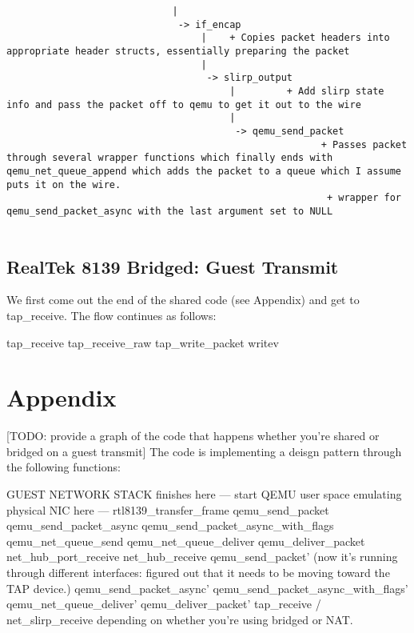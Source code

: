 \documentclass[11pt,pdftex,twocolumn]{article}
\begin{document}
\begin{verbatim}
                             |
                              -> if_encap
                                  |    + Copies packet headers into appropriate header structs, essentially preparing the packet
                                  |
                                   -> slirp_output
                                       |         + Add slirp state info and pass the packet off to qemu to get it out to the wire
                                       |
                                        -> qemu_send_packet
                                                       + Passes packet through several wrapper functions which finally ends with qemu_net_queue_append which adds the packet to a queue which I assume puts it on the wire.
                                                        + wrapper for qemu_send_packet_async with the last argument set to NULL


\end{verbatim}

\subsection{RealTek 8139 Bridged: Guest Transmit}
We first come out the end of the shared code (see Appendix) and get to tap_receive. The flow continues as follows:

tap_receive
tap_receive_raw
tap_write_packet
writev 


%
%
%
%
%

\section{Appendix}

[TODO: provide a graph of the code that happens whether you're shared or bridged on a guest transmit]
The code is implementing a deisgn pattern through the following functions: 

GUEST NETWORK STACK finishes here
--- start QEMU user space emulating physical NIC here ---
rtl8139_transfer_frame 
qemu_send_packet
qemu_send_packet_async
qemu_send_packet_async_with_flags
qemu_net_queue_send
qemu_net_queue_deliver
qemu_deliver_packet
net_hub_port_receive
net_hub_receive
qemu_send_packet' (now it's running through different interfaces: figured out that it needs to be moving toward the TAP device.)
qemu_send_packet_async'
qemu_send_packet_async_with_flags'
qemu_net_queue_deliver'
qemu_deliver_packet'
tap_receive / net_slirp_receive depending on whether you're using bridged or NAT.
\end{document}

